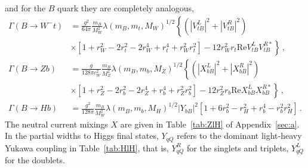 \documentclass[12pt,a4paper]{article}
\newcommand{\RE}{\text{Re}}
\begin{document}
and for the $B$ quark they are completely analogous,
\begin{align}
\Gamma(B \to W^- t) & = \frac{g^2}{64 \pi}  \frac{m_B}{M_W^2} \lambda(m_B,m_t,M_W)^{1/2} \left\{
(|V_{tB}^L|^2+|V_{tB}^R|^2)  \right. \nonumber \\
  & \left. \times \left[ 1+r_W^2-2 r_t^2  -2 r_W^4  + r_t^4 +r_W^2 r_t^2
  \right]  -12 r_W^2 r_t \RE V_{tB}^L V_{tB}^{R*} \right\}
\,, \nonumber \\
%
\Gamma(B \to Z b) & = \frac{g}{128 \pi c_W^2}  \frac{m_B}{M_Z^2} \lambda(m_B,m_b,M_Z)^{1/2}
\left\{ (|X_{bB}^L|^2 + |X_{bB}^R|^2) \right. \nonumber \\
  & \left. \times  \left[ 1 + r_Z^2 - 2  r_b^2 - 2  r_Z^4  + r_b^4
  + r_Z^2 r_b^2 \right]  -12 r_Z^2 r_b \RE X_{bB}^L X_{bB}^{R*}  \right\} \,, \nonumber \\
\Gamma(B \to H b) & = \frac{g^2}{128 \pi}
 \frac{m_B}{M_W^2} \lambda(m_B,m_b,M_H)^{1/2} |Y_{bB}|^2 \left[ 1 + 6 r_b^2 - r_H^2 
 + r_b^4 - r_b^2 r_H^2 \right] \,.
\label{ec:GammaB}
\end{align}
The neutral current mixings $X$ are given in Table~\ref{tab:ZlH} of Appendix~\ref{sec:a}. In the partial widths to Higgs final states, $Y_{qQ}$ refers to the dominant light-heavy Yukawa coupling in Table~\ref{tab:HlH}, that is,
$Y_{qQ}^R$ for the singlets and triplets, $Y_{qQ}^L$ for the doublets.
\end{document}
